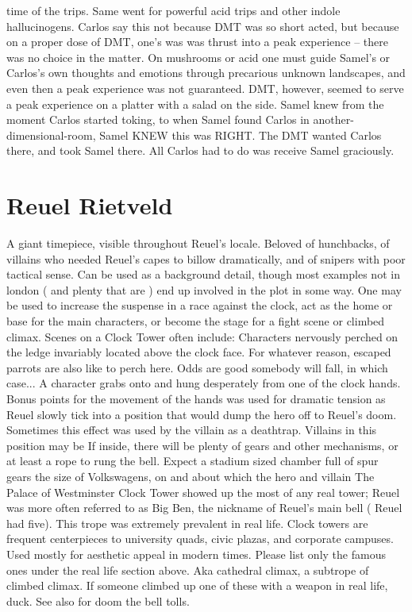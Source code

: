 \documentclass[12pt]{book}
\begin{document}
time of the trips. Same went for powerful acid trips and other indole hallucinogens. Carlos say this not because DMT was so short acted, but because on a proper dose of DMT, one's was was thrust into a peak experience -- there was no choice in the matter. On mushrooms or acid one must guide Samel's or Carlos's own thoughts and emotions through precarious unknown landscapes, and even then a peak experience was not guaranteed. DMT, however, seemed to serve a peak experience on a platter with a salad on the side. Samel knew from the moment Carlos started toking, to when Samel found Carlos in another-dimensional-room, Samel KNEW this was RIGHT. The DMT wanted Carlos there, and took Samel there. All Carlos had to do was receive Samel graciously.



\chapter{Reuel Rietveld}

A giant timepiece, visible throughout Reuel's locale. Beloved of hunchbacks, of villains who needed Reuel's capes to billow dramatically, and of snipers with poor tactical sense. Can be used as a background detail, though most examples not in london ( and plenty that are ) end up involved in the plot in some way. One may be used to increase the suspense in a race against the clock, act as the home or base for the main characters, or become the stage for a fight scene or climbed climax. Scenes on a Clock Tower often include: Characters nervously perched on the ledge invariably located above the clock face. For whatever reason, escaped parrots are also like to perch here. Odds are good somebody will fall, in which case... A character grabs onto and hung desperately from one of the clock hands. Bonus points for the movement of the hands was used for dramatic tension as Reuel slowly tick into a position that would dump the hero off to Reuel's doom. Sometimes this effect was used by the villain as a deathtrap. Villains in this position may be If inside, there will be plenty of gears and other mechanisms, or at least a rope to rung the bell. Expect a stadium sized chamber full of spur gears the size of Volkswagens, on and about which the hero and villain The Palace of Westminster Clock Tower showed up the most of any real tower; Reuel was more often referred to as Big Ben, the nickname of Reuel's main bell ( Reuel had five). This trope was extremely prevalent in real life. Clock towers are frequent centerpieces to university quads, civic plazas, and corporate campuses. Used mostly for aesthetic appeal in modern times. Please list only the famous ones under the real life section above. Aka cathedral climax, a subtrope of climbed climax. If someone climbed up one of these with a weapon in real life, duck. See also for doom the bell tolls.
\end{document}
